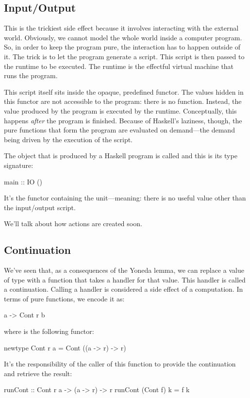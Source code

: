 \documentclass[DaoFP]{subfiles}
\begin{document}
\subsection{Input/Output}

This is the trickiest side effect because it involves interacting with the external world. Obviously, we cannot model the whole world inside a computer program. So, in order to keep the program pure, the interaction has to happen outside of it. The trick is to let the program generate a script. This script is then passed to the runtime to be executed. The runtime is the effectful virtual machine that runs the program. 

This script itself sits inside the opaque, predefined  functor. The values hidden in this functor are not accessible to the program: there is no  function. Instead, the  value produced by the program is executed by the runtime. Conceptually, this happens \emph{after} the program is finished. Because of Haskell's laziness, though, the pure functions that form the program are evaluated on demand---the demand being driven by the execution of the  script.

The  object that is produced by a Haskell program is called  and this is its type signature:
\begin{haskell}
main :: IO ()
\end{haskell}
It's the  functor containing the unit---meaning: there is no useful value other than the input/output script.

We'll talk about how  actions are created soon.

\subsection{Continuation}

We've seen that, as a consequences of the Yoneda lemma, we can replace a value of type  with a function that takes a handler for that value. This handler is called a continuation. Calling a handler is considered a side effect of a computation. In terms of pure functions, we encode it as:
\begin{haskell}
a -> Cont r b
\end{haskell}
where  is the following functor:
\begin{haskell}
newtype Cont r a = Cont ((a -> r) -> r)
\end{haskell}
It's the responsibility of the caller of this function to provide the continuation and retrieve the result:
\begin{haskell}
runCont :: Cont r a -> (a -> r) -> r
runCont (Cont f) k = f k
\end{haskell}
\end{document}
